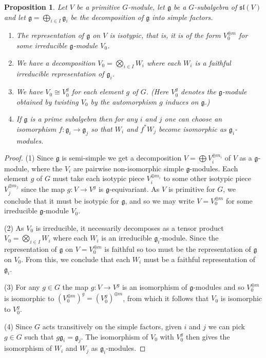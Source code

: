 \documentclass{amsart}
\newtheorem{proposition}[theorem]{Proposition}
\theoremstyle{definition}
\theoremstyle{remark}
\let\mf\mathfrak
\begin{document}
\begin{proposition}
\label{prop:iso}
Let $V$ be a primitive $G$-module, let $\mf{g}$ be a $G$-subalgebra of
$\mf{sl}(V)$ and let $\mf{g}=\bigoplus_{i \in I} \mf{g}_i$ be the decomposition
of $\mf{g}$ into simple factors.
\begin{enumerate}
\item The representation of $\mf{g}$ on $V$ is isotypic, that is, it is of the
form $V_0^{\oplus m}$ for some irreducible $\mf{g}$-module $V_0$.
\item We have a decomposition $V_0=\bigotimes_{i \in I} W_i$ where each $W_i$
is a faithful irreducible representation of $\mf{g}_i$.
\item We have $V_0 \cong V_0^g$ for each element $g$ of $G$.  (Here $V_0^g$
denotes the $\mf{g}$-module obtained by twisting $V_0$ by the automorphism
$g$ induces on $\mf{g}$.)
\item If $\mf{g}$ is a prime subalgebra then for any $i$ and $j$ one can
choose an isomorphism $f:\mf{g}_i \to \mf{g}_j$ so that $W_i$ and $f^* W_j$
become isomorphic as $\mf{g}_i$-modules.
\end{enumerate}
\end{proposition}

\begin{proof}
(1) Since $\mf{g}$ is semi-simple we get a decomposition $V=\bigoplus
V_i^{\oplus m_i}$ of $V$ as a $\mf{g}$-module, where the $V_i$ are pairwise
non-isomorphic simple $\mf{g}$-modules.  Each element $g$ of $G$ must take
each isotypic piece $V_i^{\oplus m_i}$ to some other isotypic piece
$V_j^{\oplus m_j}$ since the map $g:V \to V^g$ is $\mf{g}$-equivariant.  As
$V$ is primitive for $G$, we conclude that it must be isotypic for $\mf{g}$,
and so we may write $V=V_0^{\oplus m}$ for some irreducible $\mf{g}$-module
$V_0$.

(2) As $V_0$ is irreducible, it necessarily decomposes as a tensor product
$V_0=\bigotimes_{i \in I} W_i$ where each $W_i$ is an irreducible
$\mf{g}_i$-module.  Since the representation of $\mf{g}$ on $V=V_0^{\oplus m}$
is faithful so too must be the representation of $\mf{g}$ on $V_0$.  From this,
we conclude that each $W_i$ must be a faithful representation of $\mf{g}_i$.

(3) For any $g \in G$ the map $g:V \to V^g$ is an isomorphism of
$\mf{g}$-modules and so $V_0^{\oplus m}$ is isomorphic to $(V_0^{\oplus m})^g
=(V_0^g)^{\oplus m}$, from which it follows that $V_0$ is isomorphic to
$V_0^g$.

(4) Since $G$ acts transitively on the simple factors, given $i$ and $j$ we
can pick $g \in G$ such that $g \mf{g}_i= \mf{g}_j$.  The isomorphism of $V_0$
with $V_0^g$ then gives the isomorphism of $W_i$ and $W_j$ as
$\mf{g}_i$-modules.
\end{proof}
\end{document}
